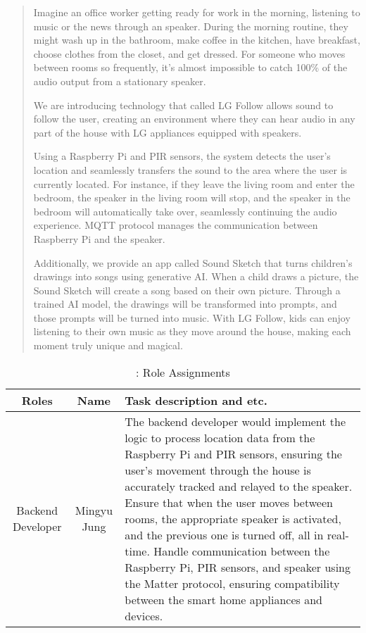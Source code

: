 \documentclass[conference]{IEEEtran}
\begin{document}
\begin{abstract}
    Imagine an office worker getting ready for work in the morning, listening to music or the news through an speaker. During the morning routine, they might wash up in the bathroom, make coffee in the kitchen, have breakfast, choose clothes from the closet, and get dressed. For someone who moves between rooms so frequently, it's almost impossible to catch 100\% of the audio output from a stationary speaker.
    
    We are introducing technology that called LG Follow allows sound to follow the user, creating an environment where they can hear audio in any part of the house with LG appliances equipped with speakers.
    
    Using a Raspberry Pi and PIR sensors, the system detects the user's location and seamlessly transfers the sound to the area where the user is currently located. For instance, if they leave the living room and enter the bedroom, the speaker in the living room will stop, and the speaker in the bedroom will automatically take over, seamlessly continuing the audio experience. MQTT protocol manages the communication between Raspberry Pi and the speaker.
    
    Additionally, we provide an app called Sound Sketch that turns children's drawings into songs using generative AI. When a child draws a picture, the Sound Sketch will create a song based on their own picture. Through a trained AI model, the drawings will be transformed into prompts, and those prompts will be turned into music. With LG Follow, kids can enjoy listening to their own music as they move around the house, making each moment truly unique and magical.

\end{abstract}





\begin{table}[h!]
\centering
\caption{: Role Assignments}
\begin{tabular}{|c|c|p{3.5cm}|}
\hline
\textbf{Roles} & \textbf{Name} & \textbf{Task description and etc.} \\
\hline
Backend Developer & Mingyu Jung & The backend developer would implement the logic to process location data from the Raspberry Pi and PIR sensors, ensuring the user’s movement through the house is accurately tracked and relayed to the speaker. Ensure that when the user moves between rooms, the appropriate speaker is activated, and the previous one is turned off, all in real-time. Handle communication between the Raspberry Pi, PIR sensors, and speaker using the Matter protocol, ensuring compatibility between the smart home appliances and devices. \\
\hline

\end{tabular}
\end{table}
\end{document}
